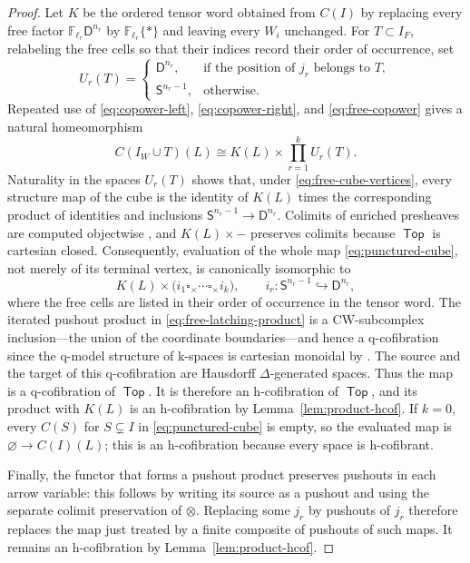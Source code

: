 \documentclass[12pt,a4paper]{amsart}
\newcommand{\Top}{\mathop{\mathsf{Top}}}
\newcommand{\Ffree}{\mathbb F}
\theoremstyle{definition}
\begin{document}
\begin{proof}
	Let \(K\) be the ordered tensor word obtained from \(C(I)\) by replacing every free factor \(\Ffree_{\ell_r}\mathsf{D}^{n_r}\) by \(\Ffree_{\ell_r}\{*\}\) and leaving every \(W_i\) unchanged.  For \(T\subset I_F\), relabeling the free cells so that their indices record their order of occurrence, set
	\[
	U_r(T)=
	\begin{cases}
		\mathsf{D}^{n_r},&\text{if the position of \(j_r\) belongs to \(T\)},\\
		\mathsf{S}^{n_r-1},&\text{otherwise}.
	\end{cases}
	\]
	Repeated use of \eqref{eq:copower-left}, \eqref{eq:copower-right}, and \eqref{eq:free-copower} gives a natural homeomorphism
	\begin{equation}\label{eq:free-cube-vertices}
		C(I_W\cup T)(L)\cong
		K(L)\times\prod_{r=1}^{k}U_r(T).
	\end{equation}
	Naturality in the spaces \(U_r(T)\) shows that, under \eqref{eq:free-cube-vertices}, every structure map of the cube is the identity of \(K(L)\) times the corresponding product of identities and inclusions \(\mathsf{S}^{n_r-1}\to \mathsf{D}^{n_r}\).  Colimits of enriched presheaves are computed objectwise \cite[Proposition~5.3]{dgrtop}, and \(K(L)\times-\) preserves colimits because \(\Top\) is cartesian closed. Consequently, evaluation of the whole map \eqref{eq:punctured-cube}, not merely of its terminal vertex, is canonically isomorphic to
	\begin{equation}\label{eq:free-latching-product}
		K(L)\times
		\bigl(i_1\mathbin{\square_\times}\cdots
		\mathbin{\square_\times}i_k\bigr),
		\qquad i_r:\mathsf{S}^{n_r-1}\hookrightarrow \mathsf{D}^{n_r},
	\end{equation}
	where the free cells are listed in their order of occurrence in the tensor word. The iterated pushout product in \eqref{eq:free-latching-product} is a CW-subcomplex inclusion---the union of the coordinate boundaries---and hence a q-cofibration since the q-model structure of k-spaces is cartesian monoidal by \cite[Proposition~4.2.11]{MR99h:55031}. The source and the target of this q-cofibration are Hausdorff \(\Delta\)-generated spaces. Thus the map is a q-cofibration of \(\Top\). It is therefore an h-cofibration of \(\Top\), and its product with \(K(L)\) is an h-cofibration by Lemma~\ref{lem:product-hcof}.  If \(k=0\), every \(C(S)\) for \(S\subsetneq I\) in \eqref{eq:punctured-cube} is empty, so the evaluated map is \(\varnothing\to C(I)(L)\); this is an h-cofibration because every space is h-cofibrant.
	
	Finally, the functor that forms a pushout product preserves pushouts in each arrow variable: this follows by writing its source as a pushout and using the separate colimit preservation of \(\otimes\).  Replacing some \(j_r\) by pushouts of \(j_r\) therefore replaces the map just treated by a finite composite of pushouts of such maps.  It remains an h-cofibration by Lemma~\ref{lem:product-hcof}.
\end{proof}
\end{document}
